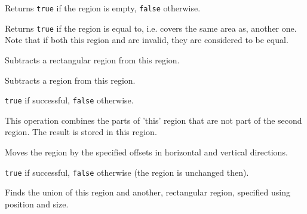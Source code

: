 \label{wxregionisempty}


Returns {\tt true} if the region is empty, {\tt false} otherwise.


\label{wxregionisequal}


Returns {\tt true} if the region is equal to, i.e. covers the same area as,
another one. Note that if both this region and  are invalid, they
are considered to be equal.


\label{wxregionsubtract}


Subtracts a rectangular region from this region.


Subtracts a region from this region.


{\tt true} if successful, {\tt false} otherwise.


This operation combines the parts of 'this' region that are not part of the second region.
The result is stored in this region.


\label{wxregionoffset}



Moves the region by the specified offsets in horizontal and vertical
directions.


{\tt true} if successful, {\tt false} otherwise (the region is unchanged then).


\label{wxregionunion}


Finds the union of this region and another, rectangular region, specified using position and size.


